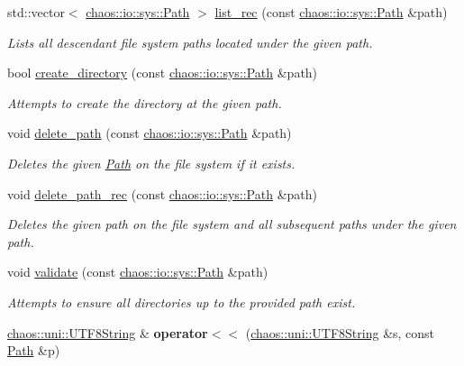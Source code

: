 \begin{DoxyCompactItemize}
std\+::vector$<$ \hyperlink{classchaos_1_1io_1_1sys_1_1_path}{chaos\+::io\+::sys\+::\+Path} $>$ \hyperlink{namespacechaos_1_1io_1_1sys_a956856df76f476b3300ab1ebe733e2a7}{list\+\_\+rec} (const \hyperlink{classchaos_1_1io_1_1sys_1_1_path}{chaos\+::io\+::sys\+::\+Path} \&path)
\begin{DoxyCompactList}\small\item\em Lists all descendant file system paths located under the given path. \end{DoxyCompactList}\item 
bool \hyperlink{namespacechaos_1_1io_1_1sys_a6bcdadf916b110395f4a2627c049da11}{create\+\_\+directory} (const \hyperlink{classchaos_1_1io_1_1sys_1_1_path}{chaos\+::io\+::sys\+::\+Path} \&path)
\begin{DoxyCompactList}\small\item\em Attempts to create the directory at the given path. \end{DoxyCompactList}\item 
void \hyperlink{namespacechaos_1_1io_1_1sys_afe2226ee576ac8aba15ca3baa0322ff6}{delete\+\_\+path} (const \hyperlink{classchaos_1_1io_1_1sys_1_1_path}{chaos\+::io\+::sys\+::\+Path} \&path)
\begin{DoxyCompactList}\small\item\em Deletes the given \hyperlink{classchaos_1_1io_1_1sys_1_1_path}{Path} on the file system if it exists. \end{DoxyCompactList}\item 
void \hyperlink{namespacechaos_1_1io_1_1sys_a00c090bbfe1da7e7cb00dc99c7459a21}{delete\+\_\+path\+\_\+rec} (const \hyperlink{classchaos_1_1io_1_1sys_1_1_path}{chaos\+::io\+::sys\+::\+Path} \&path)
\begin{DoxyCompactList}\small\item\em Deletes the given path on the file system and all subsequent paths under the given path. \end{DoxyCompactList}\item 
void \hyperlink{namespacechaos_1_1io_1_1sys_a15e20b105c40cf4d73b13afe87ce1781}{validate} (const \hyperlink{classchaos_1_1io_1_1sys_1_1_path}{chaos\+::io\+::sys\+::\+Path} \&path)
\begin{DoxyCompactList}\small\item\em Attempts to ensure all directories up to the provided path exist. \end{DoxyCompactList}\item 
\hypertarget{namespacechaos_1_1io_1_1sys_a669178b3843d1716570b4b5ca8fd417d}{}\hyperlink{classchaos_1_1uni_1_1_u_t_f8_string}{chaos\+::uni\+::\+U\+T\+F8\+String} \& {\bfseries operator$<$$<$} (\hyperlink{classchaos_1_1uni_1_1_u_t_f8_string}{chaos\+::uni\+::\+U\+T\+F8\+String} \&s, const \hyperlink{classchaos_1_1io_1_1sys_1_1_path}{Path} \&p)\label{namespacechaos_1_1io_1_1sys_a669178b3843d1716570b4b5ca8fd417d}


\end{DoxyCompactItemize}
